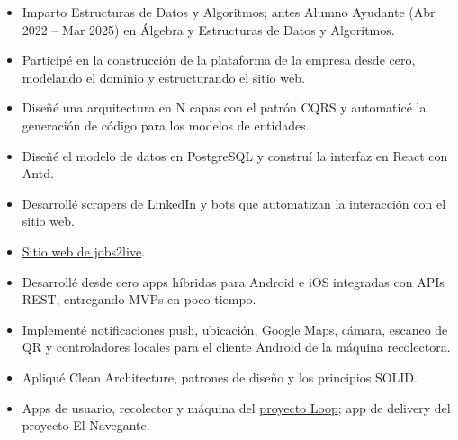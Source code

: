 \documentclass[9pt,a4paper]{altacv}
\begin{document}
\divider

\begin{itemize}
	\item Imparto Estructuras de Datos y Algoritmos; antes Alumno Ayudante (Abr 2022 -- Mar 2025) en Álgebra y Estructuras de Datos y Algoritmos.
\end{itemize}

\divider

\begin{itemize}
	\item Participé en la construcción de la plataforma de la empresa desde cero, modelando el dominio y estructurando el sitio web.
	\item Diseñé una arquitectura en N capas con el patrón CQRS y automaticé la generación de código para los modelos de entidades.
	\item Diseñé el modelo de datos en PostgreSQL y construí la interfaz en React con Antd.
	\item Desarrollé scrapers de LinkedIn y bots que automatizan la interacción con el sitio web.
	\item \href{https://www.jobs2live.com/website}{Sitio web de jobs2live}.
\end{itemize}

\divider

\begin{itemize}
	\item Desarrollé desde cero apps híbridas para Android e iOS integradas con APIs REST, entregando MVPs en poco tiempo.
	\item Implementé notificaciones push, ubicación, Google Maps, cámara, escaneo de QR y controladores locales para el cliente Android de la máquina recolectora.
	\item Apliqué Clean Architecture, patrones de diseño y los principios SOLID.
	\item Apps de usuario, recolector y máquina del \href{https://land.mideyneutraliza.com/}{proyecto Loop}; app de delivery del proyecto El Navegante.
\end{itemize}
\end{document}

